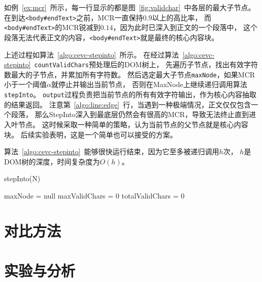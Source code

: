 如例~\ref{ex:mcr}~所示，每一行显示的都是图~\ref{fig:validchar}~中各层的最大子节点。
在到达\texttt{<body\#endText>}之前，MCR一直保持$0.9$以上的高比率，
而\texttt{<body\#endText>}的MCR锐减到$0.14$，因为此时已深入到正文的一个段落中，
这个段落无法代表正文的内容，\texttt{<body\#endText>}就是最终的核心内容块。

上述过程如算法~\ref{algo:cevc-stepinto}~所示。
在经过算法~\ref{algo:cevc-stepinto}~\texttt{countValidChars}预处理后的DOM树上，
先遍历子节点，找出有效字符数最大的子节点，并累加所有字符数。
然后选定最大子节点\texttt{maxNode}，如果MCR小于一个阈值$\alpha$就停止并输出当前节点，
否则在MaxNode上继续递归调用算法\texttt{stepInto}。
\texttt{output}过程负责把当前节点的所有有效字符输出，作为核心内容抽取的结果返回。
注意第~\ref{algo:line:edge}~行，当遇到一种极端情况，正文仅仅包含一个段落，
那么StepInto深入到最底层仍然会有很高的MCR，导致无法终止直到进入叶节点。
这时候采取一种简单的策略，认为当前节点的父节点就是核心内容块。
后续实验表明，这是一个简单也可以接受的方案。

算法~\ref{algo:cevc-stepinto}~能够很快运行结束，因为它至多被递归调用$h$次，
$h$是DOM树的深度，时间复杂度为$O(h)$。

\begin{algorithm}[htbp]
\caption{stepInto(N)}
\label{algo:cevc-stepinto}

maxNode = null \;
maxValidChars = 0 \;
totalValidChars = 0 \;

\end{algorithm}

\section{对比方法}
\label{sec:cevc-alternative}

\section{实验与分析}
\label{sec:cevc-experiment}
